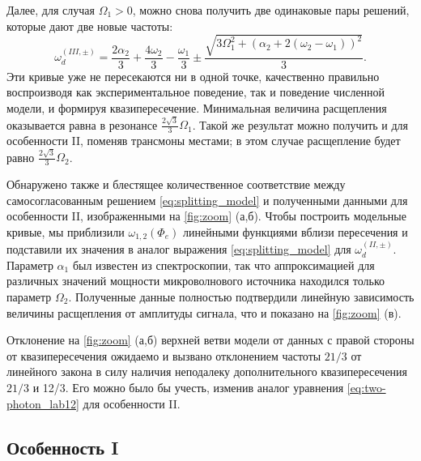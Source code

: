 \documentclass[14pt, a4paper]{extreport}
\numberwithin{equation}{section}
\begin{document}
Далее, для случая $\Omega_1 > 0$, можно снова получить две одинаковые пары решений, которые дают две новые частоты:
\begin{equation}
\omega_d^{(III, \pm)} = \frac{2 \alpha_2}{3} + \frac{4 \omega_{2}}{3} - \frac{\omega_{1}}{3} \pm \frac{\sqrt{3 \Omega_{1}^{2} + \left( \alpha_2 + 2 (\omega_{2} - \omega_{1})\right)^{2}}}{3}.
\label{eq:splitting_model}
\end{equation}
Эти кривые уже не пересекаются ни в одной точке, качественно правильно воспроизводя как экспериментальное поведение, так и поведение численной модели, и формируя квазипересечение. Минимальная величина расщепления оказывается равна в резонансе $ \frac{2\sqrt{3}}{3} \Omega_1$. Такой же результат можно получить и для особенности II, поменяв трансмоны местами; в этом случае расщепление будет равно $ \frac{2\sqrt{3}}{3} \Omega_2$.

Обнаружено также и блестящее количественное соответствие между самосогласованным решением \eqref{eq:splitting_model} и полученными данными для особенности II, изображенными на \autoref{fig:zoom} (а,б). Чтобы построить модельные кривые, мы приблизили $\omega_{1,2}(\Phi_e)$ линейными функциями вблизи пересечения и подставили их значения в аналог выражения \eqref{eq:splitting_model} для $\omega_d^{(II, \pm)}$. Параметр $\alpha_1$ был известен из спектроскопии, так что аппроксимацией для различных значений мощности микроволнового источника находился только параметр $\Omega_2$. Полученные данные полностью подтвердили линейную зависимость величины расщепления от амплитуды сигнала, что и показано на \autoref{fig:zoom} (в).

Отклонение на \autoref{fig:zoom} (а,б) верхней ветви модели от данных с правой стороны от квазипересечения ожидаемо и вызвано отклонением частоты $21/3$ от линейного закона в силу наличия неподалеку дополнительного квазипересечения $21/3$ и 12/3. Его можно было бы учесть, изменив аналог уравнения \eqref{eq:two-photon_lab12} для особенности II.

\subsection{Особенность I}
\end{document}
